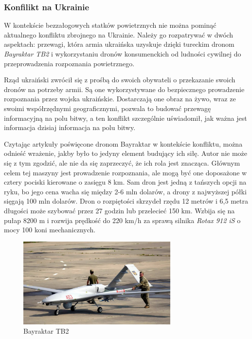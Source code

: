 \subsubsection{Konfilikt na Ukrainie}
\hspace{1cm}W kontekście bezzałogowych statków powietrznych nie można pominąć aktualnego konfliktu zbrojnego na Ukrainie. Należy go rozpatrywać w dwóch aspektach: przewagi, która armia ukraińska uzyskuje dzięki tureckim dronom \textit{Bayraktar TB2} i wykorzystaniu dronów konsumenckich od ludności cywilnej do przeprowadzenia rozpoznania powietrznego.

Rząd ukraiński zwrócił się z prośbą do swoich obywateli o przekazanie swoich dronów na potrzeby armii. Są one wykorzystywane do bezpiecznego prowadzenie rozpoznania przez wojska ukraińskie. Dostarczają one obraz na żywo, wraz ze swoimi współrzędnymi geograficznymi, pozwala to budować przewagę informacyjną na polu bitwy, a ten konflikt szczególnie uświadomił, jak ważna jest informacja dzisiaj informacja na polu bitwy.\cite{fotografia-drony-ukraina}

Czytając artykuły poświęcone dronom Bayraktar w kontekście konfliktu, można odnieść wrażenie, jakby było to jedyny element budujący ich siłę. Autor nie może się z tym zgodzić, ale nie da się zaprzeczyć, że ich rola jest znacząca. Głównym celem tej maszyny jest prowadzenie rozpoznania, ale mogą być one doposażone w cztery pociski kierowane o zasięgu 8 km. Sam dron jest jedną z tańszych opcji na ryku, bo jego cena wacha się między 2-6 mln dolarów, a drony z najwyższej półki sięgają 100 mln dolarów. Dron o rozpiętości skrzydeł rzędu 12 metrów i 6,5 metra długości może szybować przez 27 godzin lub przelecieć 150 km. Wzbija się na pułap 8200 m i rozwija prędkość do 220 km/h za sprawą silnika \textit{Rotax 912 iS} o mocy 100 koni mechanicznych. \cite{bayraktar-chip}\cite{bayraktar-pap}

\begin{figure}[!ht]
  \centering
  \includegraphics[width=8cm]{./Obrazy/Bayraktar_TB2_ukraina.jpg}
  \caption{Bayraktar TB2}
  \end{figure}


